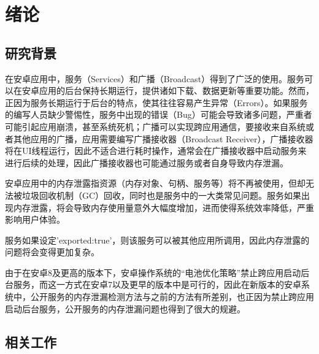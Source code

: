 \documentclass[winfonts]{njuthesis}
\begin{document}

\mainmatter

\chapter{绪论}\label{chapter_introduction}
\section{研究背景}
在安卓应用中，服务（Services）和广播（Broadcast）得到了广泛的使用。服务可以在安卓应用的后台保持长期运行，提供诸如下载、数据更新等重要功能。然而，正因为服务长期运行于后台的特点，使其往往容易产生异常（Errors）。如果服务的编写人员缺少警惕性，服务中出现的错误（Bug）可能会导致诸多问题，严重者可能引起应用崩溃，甚至系统死机；广播可以实现跨应用通信，要接收来自系统或者其他应用的广播，应用需要编写广播接收器（Broadcast Receiver），广播接收器将在UI线程运行，因此不适合进行耗时操作，通常会在广播接收器中启动服务来进行后续的处理，因此广播接收器也可能通过服务或者自身导致内存泄漏。

安卓应用中的内存泄露指资源（内存对象、句柄、服务等）将不再被使用，但却无法被垃圾回收机制（GC）回收，同时也是服务中的一大类常见问题。服务如果出现内存泄露，将会导致内存使用量意外大幅度增加，进而使得系统效率降低，严重影响用户体验。

服务如果设定'exported:true'，则该服务可以被其他应用所调用，因此内存泄露的问题将会变得更加复杂。

由于在安卓8及更高的版本下，安卓操作系统的“电池优化策略”禁止跨应用启动后台服务，而这一方式在安卓7以及更早的版本中是可行的，因此在新版本的安卓系统中，公开服务的内存泄漏检测方法与之前的方法\cite{jun2018lesdroid}有所差别，也正因为禁止跨应用启动后台服务，公开服务的内存泄漏问题也得到了很大的规避。


\section{相关工作}
\end{document}
